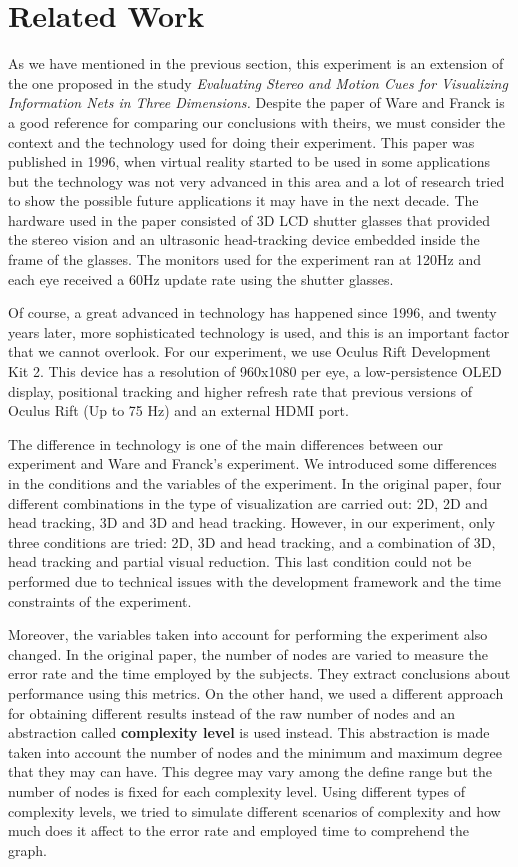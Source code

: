 \chapter{Related Work}

As we have mentioned in the previous section, this experiment is an
extension of the one proposed in the study \emph{Evaluating Stereo and
Motion Cues for Visualizing Information Nets in Three Dimensions.}
Despite the paper of Ware and Franck is a good reference for comparing
our conclusions with theirs, we must consider the context and the
technology used for doing their experiment. This paper was published in
1996, when virtual reality started to be used in some applications but
the technology was not very advanced in this area and a lot of research
tried to show the possible future applications it may have in the next
decade. The hardware used in the paper consisted of 3D LCD shutter
glasses that provided the stereo vision and an ultrasonic head-tracking
device embedded inside the frame of the glasses. The monitors used for
the experiment ran at 120Hz and each eye received a 60Hz update rate
using the shutter glasses.

Of course, a great advanced in technology has happened since 1996, and
twenty years later, more sophisticated technology is used, and this is
an important factor that we cannot overlook. For our experiment, we use
Oculus Rift Development Kit 2. This device has a resolution of 960x1080
per eye, a low-persistence OLED display, positional tracking and higher
refresh rate that previous versions of Oculus Rift (Up to 75 Hz) and an
external HDMI port.

The difference in technology is one of the main differences between our
experiment and Ware and Franck's experiment. We introduced some
differences in the conditions and the variables of the experiment. In
the original paper, four different combinations in the type of
visualization are carried out: 2D, 2D and head tracking, 3D and 3D and
head tracking. However, in our experiment, only three conditions are
tried: 2D, 3D and head tracking, and a combination of 3D, head tracking
and partial visual reduction. This last condition could not be performed
due to technical issues with the development framework and the time
constraints of the experiment.

Moreover, the variables taken into account for performing the experiment
also changed. In the original paper, the number of nodes are varied to
measure the error rate and the time employed by the subjects. They
extract conclusions about performance using this metrics. On the other
hand, we used a different approach for obtaining different results
instead of the raw number of nodes and an abstraction called
\textbf{complexity level} is used instead. This abstraction is made
taken into account the number of nodes and the minimum and maximum
degree that they may can have. This degree may vary among the define
range but the number of nodes is fixed for each complexity level. Using
different types of complexity levels, we tried to simulate different
scenarios of complexity and how much does it affect to the error rate
and employed time to comprehend the graph.

